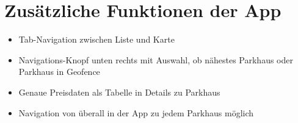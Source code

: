 \chapter{Zusätzliche Funktionen der App}
\label{chap:6}

\begin{itemize}
	\item Tab-Navigation zwischen Liste und Karte
	\item Navigations-Knopf unten rechts mit Auswahl, ob nähestes Parkhaus oder Parkhaus in Geofence
	\item Genaue Preisdaten als Tabelle in Details zu Parkhaus
	\item Navigation von überall in der App zu jedem Parkhaus möglich
\end{itemize}